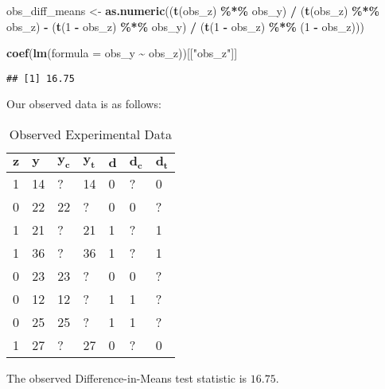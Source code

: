 \documentclass[12pt,leqno]{article}
\newenvironment{Shaded}{\begin{snugshade}}{\end{snugshade}}
\newcommand{\DataTypeTok}[1]{\textcolor[rgb]{0.13,0.29,0.53}{#1}}
\newcommand{\DecValTok}[1]{\textcolor[rgb]{0.00,0.00,0.81}{#1}}
\newcommand{\KeywordTok}[1]{\textcolor[rgb]{0.13,0.29,0.53}{\textbf{#1}}}
\newcommand{\NormalTok}[1]{#1}
\newcommand{\OperatorTok}[1]{\textcolor[rgb]{0.81,0.36,0.00}{\textbf{#1}}}
\newcommand{\StringTok}[1]{\textcolor[rgb]{0.31,0.60,0.02}{#1}}
\theoremstyle{newstyle}
\begin{document}
\begin{Shaded}
\begin{Highlighting}[]
\NormalTok{obs\_diff\_means \textless{}{-}}\StringTok{ }\KeywordTok{as.numeric}\NormalTok{((}\KeywordTok{t}\NormalTok{(obs\_z) }\OperatorTok{\%*\%}\StringTok{ }\NormalTok{obs\_y) }\OperatorTok{/}\StringTok{ }\NormalTok{(}\KeywordTok{t}\NormalTok{(obs\_z) }\OperatorTok{\%*\%}\StringTok{ }\NormalTok{obs\_z) }\OperatorTok{{-}}
\StringTok{                               }\NormalTok{(}\KeywordTok{t}\NormalTok{(}\DecValTok{1} \OperatorTok{{-}}\StringTok{ }\NormalTok{obs\_z) }\OperatorTok{\%*\%}\StringTok{ }\NormalTok{obs\_y) }\OperatorTok{/}\StringTok{ }\NormalTok{(}\KeywordTok{t}\NormalTok{(}\DecValTok{1} \OperatorTok{{-}}\StringTok{ }\NormalTok{obs\_z) }\OperatorTok{\%*\%}\StringTok{ }\NormalTok{(}\DecValTok{1} \OperatorTok{{-}}\StringTok{ }\NormalTok{obs\_z)))}

\KeywordTok{coef}\NormalTok{(}\KeywordTok{lm}\NormalTok{(}\DataTypeTok{formula =}\NormalTok{ obs\_y }\OperatorTok{\textasciitilde{}}\StringTok{ }\NormalTok{obs\_z))[[}\StringTok{"obs\_z"}\NormalTok{]]}
\end{Highlighting}
\end{Shaded}

\begin{verbatim}
## [1] 16.75
\end{verbatim}

Our observed data is as follows:

\begin{table}[H]
\centering
    \begin{tabular}{l|l|l|l|l|l|l}
    $\mathbf{z}$ & $\mathbf{y}$ & $\mathbf{y_c}$ & $\mathbf{y_t}$ & $\mathbf{d}$ & $\mathbf{d_c}$ & $\mathbf{d_t}$ \\ \hline
    1 & 14 & ? & 14 & 0 & ? & 0 \\
    0 & 22 & 22 & ? & 0 & 0 & ? \\
    1 & 21 & ? & 21 & 1 & ? & 1 \\
    1 & 36 & ? & 36 & 1 & ? & 1 \\
    0 & 23 & 23 & ? & 0 & 0 & ? \\
    0 & 12 & 12 & ? & 1 & 1 & ? \\
    0 & 25 & 25 & ? & 1 & 1 & ? \\
    1 & 27 & ?  & 27 & 0 & ? & 0\\
    \end{tabular}
    \caption{Observed Experimental Data}
\end{table}

The observed Difference-in-Means test statistic is \(16.75\).
\end{document}
